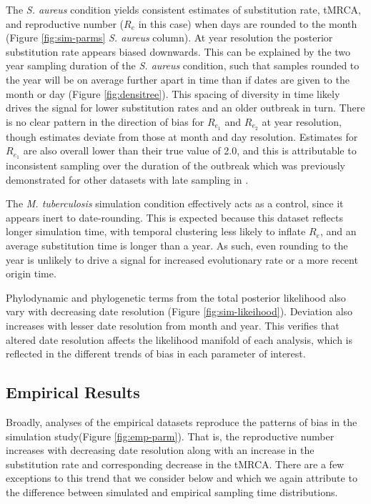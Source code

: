 \documentclass[12pt]{article}
\begin{document}
\begin{spacing}{2}
The \textit{S. aureus} condition yields consistent estimates of substitution rate, tMRCA, and reproductive number ($R_e$ in this case) when days are rounded to the month (Figure \ref{fig:sim-parms} \textit{S. aureus} column). At year resolution the posterior substitution rate appears biased downwards. This can be explained by the two year sampling duration of the \textit{S. aureus} condition, such that samples rounded to the year will be on average further apart in time than if dates are given to the month or day (Figure \ref{fig:densitree}). This spacing of diversity in time likely drives the signal for lower substitution rates and an older outbreak in turn. There is no clear pattern in the direction of bias for $R_{e_1}$ and $R_{e_2}$ at year resolution, though estimates deviate from those at month and day resolution. Estimates for $R_{e_1}$ are also overall lower than their true value of 2.0, and this is attributable to inconsistent sampling over the duration of the outbreak which was previously demonstrated for other datasets with late sampling in \cite{featherstone_infectious_2021}.

The \textit{M. tuberculosis} simulation condition effectively acts as a control, since it appears inert to date-rounding. This is expected because this dataset reflects longer simulation time, with temporal clustering less likely to inflate $R_e$, and an average substitution time is longer than a year. As such, even rounding to the year is unlikely to drive a signal for increased evolutionary rate or a more recent origin time.

Phylodynamic and phylogenetic terms from the total posterior likelihood also vary with decreasing date resolution (Figure \ref{fig:sim-likeihood}). Deviation also increases with lesser date resolution from month and year. This verifies that altered date resolution affects the likelihood manifold of each analysis, which is reflected in the different trends of bias in each parameter of interest.

\subsection*{Empirical Results}
Broadly, analyses of the empirical datasets reproduce the patterns of bias in the simulation study(Figure \ref{fig:emp-parm}). That is, the reproductive number increases with decreasing date resolution along with an increase in the substitution rate and corresponding decrease in the tMRCA. There are a few exceptions to this trend that we consider below and which we again attribute to the difference between simulated and empirical sampling time distributions.


\end{spacing}
\end{document}
